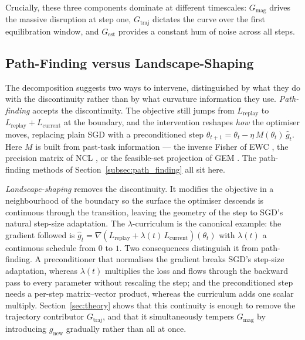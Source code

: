 Crucially, these three components dominate at different timescales: $G_{\text{mag}}$ drives the massive disruption at step one, $G_{\text{traj}}$ dictates the curve over the first equilibration window, and $G_{\text{est}}$ provides a constant hum of noise across all steps.

\subsection{Path-Finding versus Landscape-Shaping}
\label{subsec:pathfinding_vs_shaping}
The decomposition suggests two ways to intervene, distinguished by what they do with the discontinuity rather than by what curvature information they use. \emph{Path-finding} accepts the discontinuity. The objective still jumps from $L_{\text{replay}}$ to $L_{\text{replay}} + L_{\text{current}}$ at the boundary, and the intervention reshapes \emph{how} the optimiser moves, replacing plain SGD with a preconditioned step $\theta_{t+1} = \theta_t - \eta\, M(\theta_t)\,\hat{g}_t$. Here $M$ is built from past-task information --- the inverse Fisher of EWC \cite{Kirkpatrick_2017}, the precision matrix of NCL \cite{kao2021naturalcontinuallearningsuccess}, or the feasible-set projection of GEM \cite{lopezpaz2022gradientepisodicmemorycontinual}. The path-finding methods of Section~\ref{subsec:path_finding} all sit here.

\emph{Landscape-shaping} removes the discontinuity. It modifies the objective in a neighbourhood of the boundary so the surface the optimiser descends is continuous through the transition, leaving the geometry of the step to SGD's natural step-size adaptation. The $\lambda$-curriculum is the canonical example: the gradient followed is $\hat{g}_t = \nabla\!\left(L_{\text{replay}} + \lambda(t)\, L_{\text{current}}\right)(\theta_t)$ with $\lambda(t)$ a continuous schedule from $0$ to $1$. Two consequences distinguish it from path-finding. A preconditioner that normalises the gradient breaks SGD's step-size adaptation, whereas $\lambda(t)$ multiplies the loss and flows through the backward pass to every parameter without rescaling the step; and the preconditioned step needs a per-step matrix--vector product, whereas the curriculum adds one scalar multiply. Section~\ref{sec:theory} shows that this continuity is enough to remove the trajectory contributor $G_{\text{traj}}$, and that it simultaneously tempers $G_{\text{mag}}$ by introducing $g_{\text{new}}$ gradually rather than all at once.
